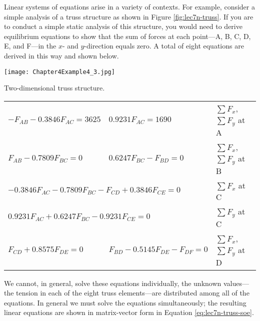Linear systems of equations arise in a variety of contexts.  For example, consider a simple analysis of a truss structure as shown in Figure \ref{fig:lec7n-truss}.  If you are to conduct a simple static analysis of this structure, you would need to derive equilibrium equations to show that the sum of forces at each point---A, B, C, D, E, and F---in the $x$- and $y$-direction equals zero.  A total of eight equations are derived in this way and shown below.
\begin{marginfigure}
\texttt{[image: Chapter4Example4\_3.jpg]}
\caption{Two-dimensional truss structure.}
\label{fig:lec7n-truss}
\end{marginfigure}
\begin{centering}
\begin{table}
\begin{tabular}{l l l}
$-F_{AB} - 0.3846F_{AC} = 3625$ & $0.9231F_{AC} = 1690$ & $\sum F_{x}$, $\sum {F_y}$ at A \\
$F_{AB} - 0.7809 F_{BC}=0$ & $0.6247F_{BC} - F_{BD} = 0$ & $\sum F_{x}$, $\sum {F_y}$ at B\\
\multicolumn{2}{l}{$- 0.3846F_{AC} - 0.7809F_{BC} - F_{CD} + 0.3846F_{CE}  = 0$} & $\sum F_{x}$ at C \\
\multicolumn{2}{l}{$0.9231F_{AC}+0.6247F_{BC} - 0.9231F_{CE} = 0$} & $\sum F_{y}$ at C \\
$F_{CD}+0.8575F_{DE} = 0$ & $F_{BD} - 0.5145F_{DE} - F_{DF} = 0$ & $\sum F_{x}$, $\sum {F_y}$ at D\\
\end{tabular}
\end{table}
\end{centering}
We cannot, in general, solve these equations individually, the unknown values---the tension in each of the eight truss elements---are distributed among all of the equations.  In general we must solve the equations simultaneously; the resulting linear equations are shown in matrix-vector form in Equation \ref{eq:lec7n-truss-soe}.
